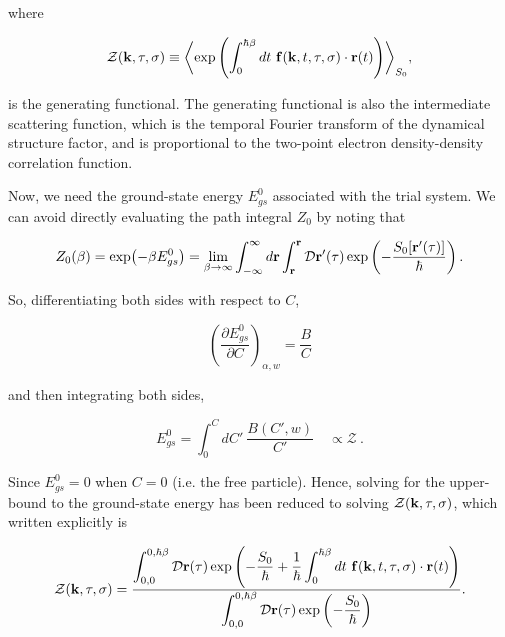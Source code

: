where

\begin{equation}
    \mathcal{Z}(\vb{k}, \tau, \sigma) \equiv \biggl\langle \exp\left(\int_0^{\hbar\beta} dt\ \vb{f}(\vb{k}, t, \tau, \sigma) \cdot \vb{r}(t) \right) \biggr\rangle_{S_0},
\end{equation}

is the generating functional. The generating functional is also the intermediate scattering function, which is the temporal Fourier transform of the dynamical structure factor, and is proportional to the two-point electron density-density correlation function. 

Now, we need the ground-state energy $E^0_{gs}$ associated with the trial system. We can avoid directly evaluating the path integral $Z_0$ by noting that

\begin{equation}\label{eqn:trial_partition}
    Z_0(\beta) = \exp(-\beta E^0_{gs}) = \lim_{\beta \to \infty} \int^{\infty}_{-\infty} d\vb{r} \int^{\vb{r}}_{\vb{r}} \mathcal{D}\vb{r'}(\tau) \exp\left(-\frac{S_0[\vb{r'}(\tau)]}{\hbar}\right).
\end{equation}

So, differentiating both sides with respect to $C$,

\begin{equation}
     \left( \frac{\partial E_{gs}^0}{\partial C}\right)_{\alpha, w} = \frac{B}{C}
\end{equation}

and then integrating both sides,

\begin{equation}
    E^{0}_{gs} = \int^{C}_0 dC'\ \frac{B(C', w)}{C'} \quad \propto \mathcal{Z} \ .
\end{equation}

Since $ E^{0}_{gs} = 0$ when $C = 0$ (i.e. the free particle). Hence, solving for the upper-bound to the ground-state energy has been reduced to solving $\mathcal{Z}(\vb{k}, \tau, \sigma)$, which written explicitly is

\begin{equation}\label{eqn:gen_func}
    \mathcal{Z}(\vb{k}, \tau, \sigma) = \frac{\displaystyle \int^{0, \hbar\beta}_{0,0} \mathcal{D}\vb{r}(\tau) \exp\left(-\frac{S_0}{\hbar} +  \frac{1}{\hbar}\int^{\hbar\beta}_0 dt\ \vb{f}(\vb{k}, t, \tau, \sigma) \cdot \vb{r}(t) \right)}{\displaystyle \int^{0, \hbar\beta}_{0, 0} \mathcal{D}\vb{r}(\tau) \exp\left(-\frac{S_0}{\hbar}\right)}.
\end{equation}

